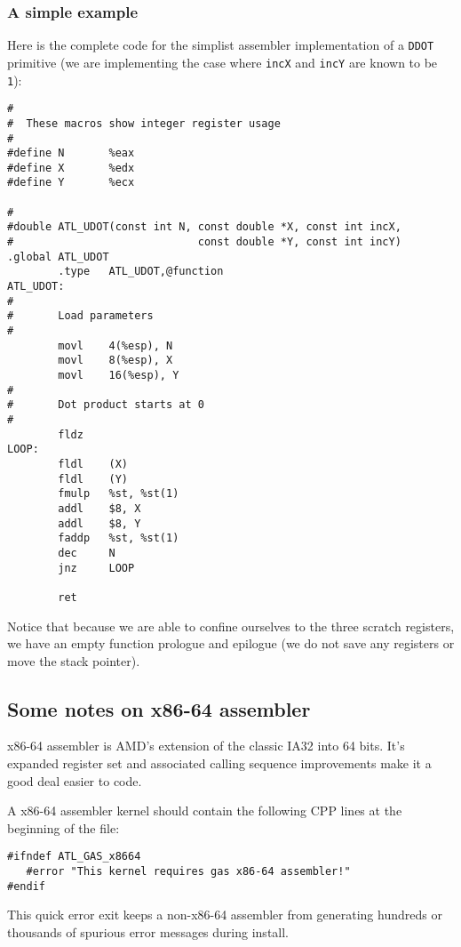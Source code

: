 \documentclass[11pt]{article}
\begin{document}
\subsubsection{A simple example\label{sec-DDOT-ass}}
Here is the complete code for the simplist assembler implementation of a
{\tt DDOT} primitive (we are implementing the case where {\tt incX} and
{\tt incY} are known to be {\tt 1}):
\begin{verbatim}
#
#  These macros show integer register usage
#
#define N       %eax
#define X       %edx
#define Y       %ecx

#
#double ATL_UDOT(const int N, const double *X, const int incX,
#                             const double *Y, const int incY)
.global ATL_UDOT
        .type   ATL_UDOT,@function
ATL_UDOT:
#
#       Load parameters
#
        movl    4(%esp), N
        movl    8(%esp), X
        movl    16(%esp), Y
#
#       Dot product starts at 0
#
        fldz    
LOOP:
        fldl    (X)
        fldl    (Y)
        fmulp   %st, %st(1)
        addl    $8, X
        addl    $8, Y
        faddp   %st, %st(1)
        dec     N
        jnz     LOOP

        ret
\end{verbatim}

Notice that because we are able to confine ourselves to the three scratch
registers, we have an empty function prologue and epilogue (we do not save
any registers or move the stack pointer).

\newpage
\subsection{Some notes on x86-64 assembler}
x86-64 assembler is AMD's extension of the classic IA32 into 64 bits.
It's expanded register set and associated calling sequence improvements
make it a good deal easier to code. 

A x86-64 assembler kernel should contain the following CPP lines at the
beginning of the file:
\begin{verbatim}
#ifndef ATL_GAS_x8664
   #error "This kernel requires gas x86-64 assembler!"
#endif
\end{verbatim}
This quick error exit keeps a non-x86-64 assembler from generating hundreds
or thousands of spurious error messages during install.
\end{document}
